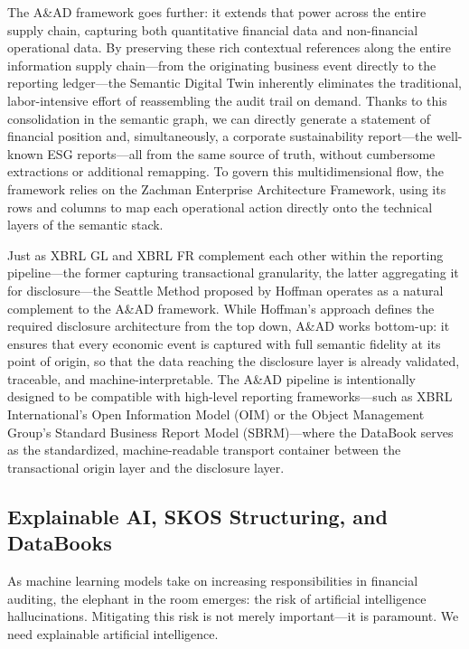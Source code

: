 \documentclass[12pt, a4paper]{article}
\begin{document}
The A\&AD framework goes further: it extends that power across the entire supply chain, capturing both quantitative financial data and non-financial operational data. By preserving these rich contextual references along the entire information supply chain---from the originating business event directly to the reporting ledger---the Semantic Digital Twin inherently eliminates the traditional, labor-intensive effort of reassembling the audit trail on demand. Thanks to this consolidation in the semantic graph, we can directly generate a statement of financial position and, simultaneously, a corporate sustainability report---the well-known ESG reports---all from the same source of truth, without cumbersome extractions or additional remapping. To govern this multidimensional flow, the framework relies on the Zachman Enterprise Architecture Framework, using its rows and columns to map each operational action directly onto the technical layers of the semantic stack.

Just as XBRL GL and XBRL FR complement each other within the reporting pipeline---the former capturing transactional granularity, the latter aggregating it for disclosure---the Seattle Method proposed by Hoffman \cite{hoffman2025} operates as a natural complement to the A\&AD framework. While Hoffman's approach defines the required disclosure architecture from the top down, A\&AD works bottom-up: it ensures that every economic event is captured with full semantic fidelity at its point of origin, so that the data reaching the disclosure layer is already validated, traceable, and machine-interpretable. The A\&AD pipeline is intentionally designed to be compatible with high-level reporting frameworks---such as XBRL International's Open Information Model (OIM) or the Object Management Group's Standard Business Report Model (SBRM)---where the DataBook serves as the standardized, machine-readable transport container between the transactional origin layer and the disclosure layer.

\subsection{Explainable AI, SKOS Structuring, and DataBooks}

As machine learning models take on increasing responsibilities in financial auditing, the elephant in the room emerges: the risk of artificial intelligence hallucinations. Mitigating this risk is not merely important---it is paramount. We need explainable artificial intelligence.
\end{document}

